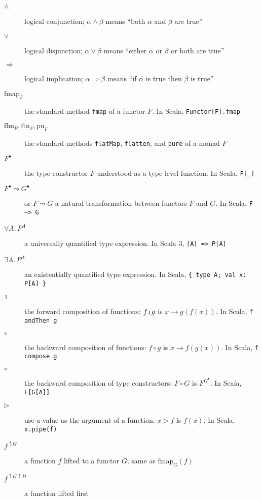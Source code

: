 \begin{description}
\item [{$\wedge$}] \textemdash{} logical conjunction; $\alpha\wedge\beta$
means \textsf{``}both $\alpha$ and $\beta$ are true\textsf{''}
\item [{$\vee$}] \textemdash{} logical disjunction; $\alpha\vee\beta$
means \textsf{``}either $\alpha$ or $\beta$ or both are true\textsf{''}
\item [{$\Rightarrow$}] \textemdash{} logical implication; $\alpha\Rightarrow\beta$
means \textsf{``}if $\alpha$ is true then $\beta$ is true\textsf{''}
\item [{$\text{fmap}_{F}$}] \textemdash{} the standard method \lstinline!fmap!
of a functor $F$. In Scala, \lstinline!Functor[F].fmap!
\item [{$\text{flm}_{F},\text{ftn}_{F},\text{pu}_{F}$}] \textemdash{}
the standard methods \lstinline!flatMap!, \lstinline!flatten!, and
\lstinline!pure! of a monad $F$
\item [{$F^{\bullet}$}] \textemdash{} the type constructor $F$ understood
as a type-level function. In Scala, \lstinline!F[_]! 
\item [{$F^{\bullet}\leadsto G^{\bullet}$}] \textemdash{} or $F\leadsto G$
a natural transformation between functors $F$ and $G$. In Scala,
\lstinline!F ~> G!
\item [{$\forall A.\,P^{A}$}] \textemdash{} a universally quantified type
expression. In Scala 3, \lstinline![A] => P[A]!
\item [{$\exists A.\,P^{A}$}] \textemdash{} an existentially quantified
type expression. In Scala, \lstinline!{ type A; val x: P[A] }! 
\item [{$\bef$}] \textemdash{} the forward composition of functions: $f\bef g$
is $x\rightarrow g(f(x))$. In Scala, \lstinline!f andThen g!
\item [{$\circ$}] \textemdash{} the backward composition of functions:
$f\circ g$ is $x\rightarrow f(g(x))$. In Scala, \lstinline!f compose g!
\item [{$\circ$}] \textemdash{} the backward composition of type constructors:
$F\circ G$ is $F^{G^{\bullet}}$. In Scala, \lstinline!F[G[A]]! 
\item [{$\triangleright$}] \textemdash{} use a value as the argument of
a function: $x\triangleright f$ is $f(x)$. In Scala, \lstinline!x.pipe(f)!
\item [{$f^{\uparrow G}$}] \textemdash{} a function $f$ lifted to a functor
$G$; same as $\text{fmap}_{G}(f)$
\item [{$f^{\uparrow G\uparrow H}$}] \textemdash{} a function lifted first

\end{description}
